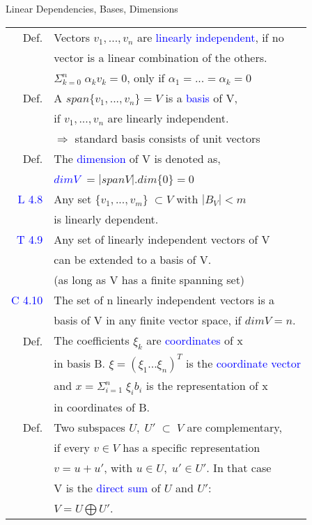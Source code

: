 \begin{mainbox}{Linear Dependencies, Bases, Dimensions}
\setlength{\tabcolsep}{2pt}
\begin{tabular}{rl}
	Def. & Vectors $v_1, ..., v_n$ are \textcolor{blue}{linearly independent}, if no\\
	& vector is a linear combination of the others.\\
	& $\Sigma_{k=0}^{n}\;\alpha_k v_k = 0$, only if $\alpha_1 = ... = \alpha_k = 0$ \\
	\rule{0pt}{3ex} 
	Def. & A $span\{v_1, ..., v_n\} = V$ is a \textcolor{blue}{basis} of V,\\
	& if $v_1, ..., v_n$ are linearly independent.\\ 
	& $\Rightarrow$ standard basis consists of unit vectors\\
	\rule{0pt}{3ex} 
	Def. & The \textcolor{blue}{dimension} of V is denoted as,\\
	& \textcolor{blue}{$dimV$} $=|spanV|$.\quad$dim\{0\} = 0$\\
	\rule{0pt}{3ex} 
	\textcolor{blue}{L 4.8} & Any set $\{v_1, ..., v_m\}\;\subset V$ with $|B_V| < m$ \\
	& is linearly dependent.\\
	\rule{0pt}{3ex} 
	\textcolor{blue}{T 4.9} & Any set of linearly independent vectors of V\\
	& can be extended to a basis of V.\\
	& (as long as V has a finite spanning set)\\
	\rule{0pt}{3ex} 
	\textcolor{blue}{C 4.10} & The set of n linearly independent vectors is a\\
	& basis of V in any finite vector space, if $dimV = n$.\\
	\rule{0pt}{3ex}
	Def. & The coefficients $\xi_k$ are \textcolor{blue}{coordinates} of x\\
	& in basis B. $\xi = (\xi_1 ... \xi_n)^T$ is the \textcolor{blue}{coordinate vector}\\
	& and $x = \Sigma_{i=1}^n\;\xi_ib_i$ is the representation of x\\
	& in coordinates of B.\\
	\rule{0pt}{3ex}
	Def. & Two subspaces $U,\;U'\;\subset\;V$ are complementary,\\
	& if every $v\in V$ has a specific representation \\
	& $v=u+u'$, with $u\in U,\; u' \in U'$. In that case\\
	& V is the \textcolor{blue}{direct sum} of $U$ and $U'$:\\
	& $V = U \bigoplus U'$.\\
\end{tabular}
\end{mainbox}

